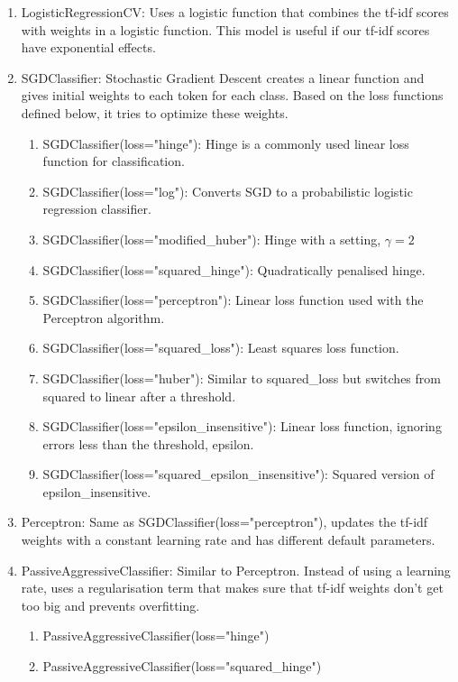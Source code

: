 \documentclass[twoside,11pt]{article}
\begin{document}
\begin{enumerate}
\scriptsize

\item LogisticRegressionCV: Uses a logistic function that combines the tf-idf scores with weights in a logistic function. This model is useful if our tf-idf scores have exponential effects.
\item SGDClassifier: Stochastic Gradient Descent creates a linear function and gives initial weights to each token for each class. Based on the loss functions defined below, it tries to optimize these weights.
\begin{enumerate}
\item SGDClassifier(loss="hinge"): Hinge is a commonly used linear loss function for classification.
\item SGDClassifier(loss="log"): Converts SGD to a probabilistic logistic regression classifier.
\item SGDClassifier(loss="modified\_huber"): Hinge with a setting, $\gamma=2$
\item SGDClassifier(loss="squared\_hinge"): Quadratically penalised hinge.
\item SGDClassifier(loss="perceptron"): Linear loss function used with the Perceptron algorithm.
\item SGDClassifier(loss="squared\_loss"): Least squares loss function.
\item SGDClassifier(loss="huber"): Similar to squared\_loss but switches from squared to linear after a threshold.
\item SGDClassifier(loss="epsilon\_insensitive"): Linear loss function, ignoring errors less than the threshold, epsilon.
\item SGDClassifier(loss="squared\_epsilon\_insensitive"): Squared version of epsilon\_insensitive.
\end{enumerate}
\item Perceptron: Same as SGDClassifier(loss="perceptron"), updates the tf-idf weights with a constant learning rate and has different default parameters.
\item PassiveAggressiveClassifier: Similar to Perceptron. Instead of using a learning rate, uses a regularisation term that makes sure that tf-idf weights don't get too big and prevents overfitting.
\begin{enumerate}
\item PassiveAggressiveClassifier(loss="hinge")
\item PassiveAggressiveClassifier(loss="squared\_hinge")
\end{enumerate}

\end{enumerate}
\end{document}
